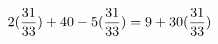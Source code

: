 \documentclass[preview]{standalone}
\begin{document}
\begin{align*}
\special{dvisvgm:raw <g id='unique000'>}2(\frac{31}{33}) + 40 - 5(\frac{31}{33}) = 9 + 30(\frac{31}{33})\special{dvisvgm:raw </g>}
\end{align*}
\end{document}
